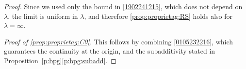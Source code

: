 \documentclass[10pt,a4paper]{amsart}
\begin{document}
\begin{proof}
Since we used only the bound in
\eqref{1902241215}, which does not depend on $\lambda$, the limit is uniform in $\lambda$, and therefore \ref{prop:proprietag:RS} holds also for $\lambda=\infty$.
\medskip

\noindent \textit{Proof of \ref{prop:proprietag:C0}.} This follows by combining \eqref{0105232216}, which guarantees the continuity at the origin, and the subadditivity stated in
Proposition~\ref{p:bpg}\ref{p:bpg:subadd}.
\end{proof}
\end{document}
